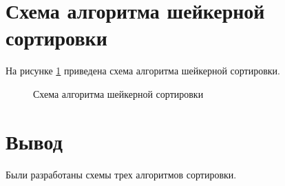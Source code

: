 \section{Схема алгоритма шейкерной сортировки}

На рисунке \ref{fig:shaker} приведена схема алгоритма шейкерной сортировки.

\begin{figure}[h!]
	
	
	\caption{Схема алгоритма шейкерной сортировки}
	
	\label{fig:shaker}
	
\end{figure}



\section*{Вывод}

Были разработаны схемы трех алгоритмов сортировки.



